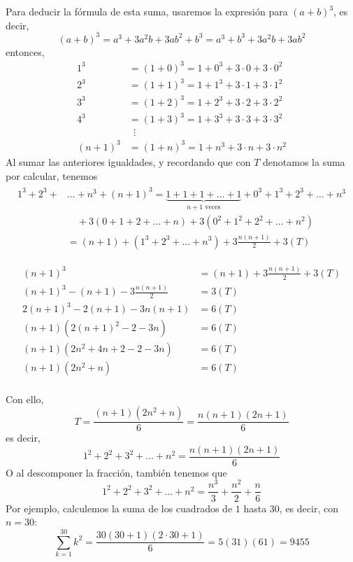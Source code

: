 Para deducir la fórmula de esta suma, usaremos la expresión para $(a+b)^3$, es decir,
\[(a+b)^3=a^3+3a^2b+3ab^2+b^3=a^3+b^3+3a^2b+3ab^2\]
entonces,
\begin{align*}
  1^3&=(1+0)^3=1+0^3+3\cdot 0+3\cdot 0^2\\
  2^3&=(1+1)^3=1+1^3+3\cdot 1+3\cdot 1^2\\
  3^3&=(1+2)^3=1+2^3+3\cdot 2+3\cdot 2^2\\
  4^3&=(1+3)^3=1+3^3+3\cdot 3+3\cdot 3^2\\
  &\enspace\vdots \\
  (n+1)^3&=(1+n)^3=1+n^3+3\cdot n+3\cdot n^2
\end{align*}
Al sumar las anteriores igualdades, y recordando que con $T$ denotamos la suma por calcular, tenemos \enlargethispage*{\baselineskip}
\begin{gather*}
  \begin{aligned}
    1^3+2^3+&\ldots+n^3+(n+1)^3=\underbrace{1+1+1+\ldots+1}_{\text{$n+1$ veces}}+0^3+1^3+2^3+\ldots+n^3\\
    &\quad+3(0+1+2+\ldots+n)+3(0^2+1^2+2^2+\ldots+n^2)\\
    &=(n+1)+(1^3+2^3+\ldots+n^3)+3\frac{n(n+1)}{2}+3(T)
  \end{aligned}
\end{gather*}
\begin{small}
  \begin{align*}
    (n+1)^3&=(n+1)+3\frac{n(n+1)}{2}+3(T)\\
    (n+1)^3-(n+1)-3\frac{n(n+1)}{2}&=3(T)\\
    2(n+1)^3-2(n+1)-3n(n+1)&=6(T)\\
    (n+1)\left(2(n+1)^2-2-3n\right)&=6(T)\\
    (n+1)\left(2n^2+4n+2-2-3n\right)&=6(T)\\
    (n+1)\left(2n^2+n\right)&=6(T)\\
  \end{align*}
\end{small}

Con ello,
\[T=\frac{(n+1)\left(2n^2+n\right)}{6}=\frac{n(n+1)(2n+1)}{6}\]
es decir,
\[1^{2}+2^{2}+3^{2}+\ldots +n^{2}=\frac{n(n+1)(2n+1)}{6}\]
O al descomponer la fracción, también tenemos que
\[1^{2}+2^{2}+3^{2}+\ldots +n^{2}=\frac{n^3}{3}+\frac{n^2}{2}+\frac{n}{6}\]
Por ejemplo, calculemos la suma de los cuadrados de $1$ hasta $30$, es decir, con $n=30$:
\[
  \sum_{k=1}^{30}k^2=\frac{30(30+1)(2\cdot30+1)}{6}=5(31)(61)=9455
\]

